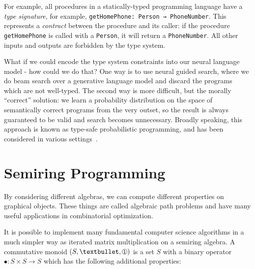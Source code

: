 \documentclass[10pt]{article}
\newcommand*\circled[1]{\tikz[baseline=-0.1cm]{\node[shape=circle,draw,inner sep=0.48pt] (char) {\fontsize{7}{12}\textsf{#1}};}}
\begin{document}
For example, all procedures in a statically-typed programming language have a \textit{type signature}, for example, \texttt{getHomePhone: Person → PhoneNumber}. This represents a \textit{contract} between the procedure and its caller: if the procedure \texttt{getHomePhone} is called with a \texttt{Person}, it will return a \texttt{PhoneNumber}. All other inputs and outputs are forbidden by the type system.

What if we could encode the type system constraints into our neural language model - how could we do that? One way is to use neural guided search, where we do beam search over a generative language model and discard the programs which are not well-typed. The second way is more difficult, but the morally ``correct'' solution: we learn a probability distribution on the space of semantically correct programs from the very outset, so the result is always guaranteed to be valid and search becomes unnecessary. Broadly speaking, this approach is known as type-safe probabilistic programming, and has been considered in various settings~\cite{murali2017bayesian}.

\pagebreak\section{Semiring Programming}\label{sec:semiring-programming}

By considering different algebras, we can compute different properties on graphical objects. These things are called algebraic path problems and have many useful applications in combinatorial optimization.

It is possible to implement many fundamental computer science algorithms in a much simpler way as iterated matrix multiplication on a semiring algebra. A commutative monoid $(S, •, \circled{1})$ is a set $S$ with a binary operator $•: S \times S → S$ which has the following additional properties:

\end{document}
